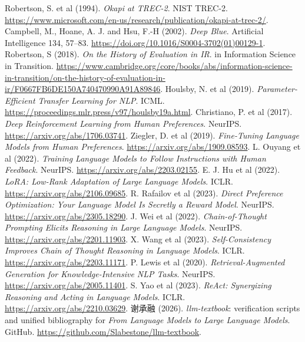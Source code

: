  Robertson, S. et al (1994). \emph{Okapi at TREC-2}. NIST TREC-2. \url{https://www.microsoft.com/en-us/research/publication/okapi-at-trec-2/}.
 Campbell, M., Hoane, A. J. and Hsu, F.-H (2002). \emph{Deep Blue}. Artificial Intelligence 134, 57--83. \url{https://doi.org/10.1016/S0004-3702(01)00129-1}.
 Robertson, S (2018). \emph{On the History of Evaluation in IR}. in Information Science in Transition. \url{https://www.cambridge.org/core/books/abs/information-science-in-transition/on-the-history-of-evaluation-in-ir/F0667FB6DE150A740470990A91A89846}.
 Houlsby, N. et al (2019). \emph{Parameter-Efficient Transfer Learning for NLP}. ICML. \url{https://proceedings.mlr.press/v97/houlsby19a.html}.
 Christiano, P. et al (2017). \emph{Deep Reinforcement Learning from Human Preferences}. NeurIPS. \url{https://arxiv.org/abs/1706.03741}.
 Ziegler, D. et al (2019). \emph{Fine-Tuning Language Models from Human Preferences}. \url{https://arxiv.org/abs/1909.08593}.
 L. Ouyang et al (2022). \emph{Training Language Models to Follow Instructions with Human Feedback}. NeurIPS. \url{https://arxiv.org/abs/2203.02155}.
 E. J. Hu et al (2022). \emph{LoRA: Low-Rank Adaptation of Large Language Models}. ICLR. \url{https://arxiv.org/abs/2106.09685}.
 R. Rafailov et al (2023). \emph{Direct Preference Optimization: Your Language Model Is Secretly a Reward Model}. NeurIPS. \url{https://arxiv.org/abs/2305.18290}.
 J. Wei et al (2022). \emph{Chain-of-Thought Prompting Elicits Reasoning in Large Language Models}. NeurIPS. \url{https://arxiv.org/abs/2201.11903}.
 X. Wang et al (2023). \emph{Self-Consistency Improves Chain of Thought Reasoning in Language Models}. ICLR. \url{https://arxiv.org/abs/2203.11171}.
 P. Lewis et al (2020). \emph{Retrieval-Augmented Generation for Knowledge-Intensive NLP Tasks}. NeurIPS. \url{https://arxiv.org/abs/2005.11401}.
 S. Yao et al (2023). \emph{ReAct: Synergizing Reasoning and Acting in Language Models}. ICLR. \url{https://arxiv.org/abs/2210.03629}.
 谢承融 (2026). \emph{llm-textbook}: verification scripts and unified bibliography for \emph{From Language Models to Large Language Models}. GitHub. \url{https://github.com/Slabestone/llm-textbook}.

